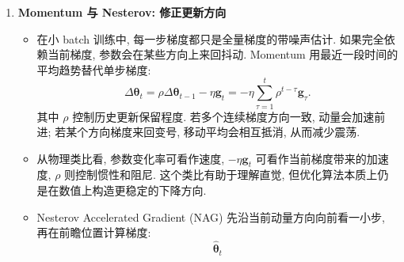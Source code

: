 \documentclass{../nndlcourse}
\begin{document}
\begin{enumerate}
\begin{itemize}
      \item Adagrad 根据历史梯度平方和调整每个坐标的有效学习率:
      \[
        \boldsymbol{G}_t
        =
        \sum_{\tau=1}^{t}
        \boldsymbol{g}_{\tau}\odot\boldsymbol{g}_{\tau},
        \qquad
        \Delta\boldsymbol{\theta}_t
        =
        -\eta
        \frac{\boldsymbol{g}_t}{\sqrt{\boldsymbol{G}_t}+\epsilon}.
      \]
      \item Adagrad 的限制是 $\boldsymbol{G}_t$ 单调增大, 有效学习率会不断变小. 若早期没有找到足够好的区域, 后期步长可能过小, 使算法难以继续移动.
      \item RMSProp 使用指数滑动平均替代累积和:
      \[
        \boldsymbol{G}_t
        =
        \beta \boldsymbol{G}_{t-1}
        +
        (1-\beta)\boldsymbol{g}_t\odot\boldsymbol{g}_t
        =
        (1-\beta)\sum_{\tau=1}^{t}
        \beta^{t-\tau}
        \boldsymbol{g}_{\tau}\odot\boldsymbol{g}_{\tau},
        \qquad
        \Delta\boldsymbol{\theta}_t
        =
        -\eta
        \frac{\boldsymbol{g}_t}{\sqrt{\boldsymbol{G}_t}+\epsilon}.
      \]
      这使得很久以前的梯度影响逐渐衰减, 因而有效学习率既可以变小, 也可以在局部梯度变小时重新变大.
      \item Adadelta 进一步用参数更新量的滑动平均替代固定学习率的一部分. 其直观目标是让更新步长本身也更平滑, 减少手动选择全局学习率的压力. 在现代实践中, RMSProp 和 Adam 更常作为默认候选.
    \end{itemize}
  \item \textbf{Momentum 与 Nesterov: 修正更新方向}
    \begin{itemize}
      \item 在小 batch 训练中, 每一步梯度都只是全量梯度的带噪声估计. 如果完全依赖当前梯度, 参数会在某些方向上来回抖动. Momentum 用最近一段时间的平均趋势替代单步梯度:
      \[
        \Delta\boldsymbol{\theta}_t
        =
        \rho\Delta\boldsymbol{\theta}_{t-1}
        -
        \eta\boldsymbol{g}_t
        =
        -\eta
        \sum_{\tau=1}^{t}
        \rho^{t-\tau}\boldsymbol{g}_{\tau}.
      \]
      其中 $\rho$ 控制历史更新保留程度. 若多个连续梯度方向一致, 动量会加速前进; 若某个方向梯度来回变号, 移动平均会相互抵消, 从而减少震荡.
      \item 从物理类比看, 参数变化率可看作速度, $-\eta\boldsymbol{g}_t$ 可看作当前梯度带来的加速度, $\rho$ 则控制惯性和阻尼. 这个类比有助于理解直觉, 但优化算法本质上仍是在数值上构造更稳定的下降方向.
      \item Nesterov Accelerated Gradient (NAG) 先沿当前动量方向向前看一小步, 再在前瞻位置计算梯度:
      \[
        \hat{\boldsymbol{\theta}}_t
\]
\end{itemize}
\end{enumerate}
\end{document}
